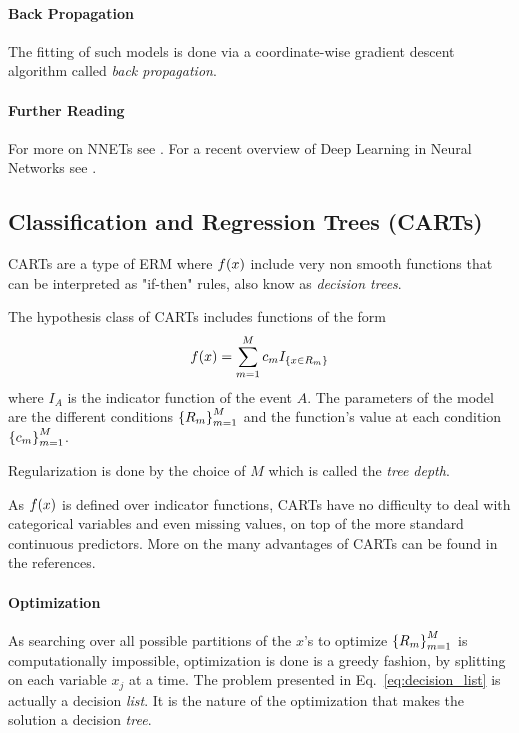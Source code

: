 \paragraph{Back Propagation}
The fitting of such models is done via a coordinate-wise gradient descent algorithm called \emph{back propagation}.

\paragraph{Further Reading}
For more on NNETs see \citep[Chapter 11]{hastie_elements_2003}.
For a recent overview of Deep Learning in Neural Networks see \cite{schmidhuber_deep_2015}.




\subsection{Classification and Regression Trees (CARTs)}
CARTs are a type of ERM where $f(x)$ include very non smooth functions that can be interpreted as "if-then" rules, also know as \emph{decision trees}.

The hypothesis class of CARTs includes functions of the form
\begin{align}
\label{eq:decision_list}
	f(x)=\sum_{m=1}^M c_m I_{\left\{ x \in R_m \right\}}
\end{align}
where $I_A$ is the indicator function of the event $A$.
The parameters of the model are the different conditions $\left\{ R_m \right\}_{m=1}^M$ and the function's value at each condition $\left\{ c_m \right\}_{m=1}^M$. 

Regularization is done by the choice of $M$ which is called the \emph{tree depth}.

As $f(x)$ is defined over indicator functions, CARTs have no difficulty to deal with categorical variables and even missing values, on top of the more standard continuous predictors. More on the many advantages of CARTs can be found in the references.

\paragraph{Optimization}
As searching over all possible partitions of the $x$'s to optimize $\left\{ R_m \right\}_{m=1}^M$ is computationally impossible, optimization is done is a greedy fashion, by splitting on each variable $x_j$ at a time.
The problem presented in Eq.~\ref{eq:decision_list} is actually a decision \emph{list}. It is the nature of the optimization that makes the solution a decision \emph{tree}.


